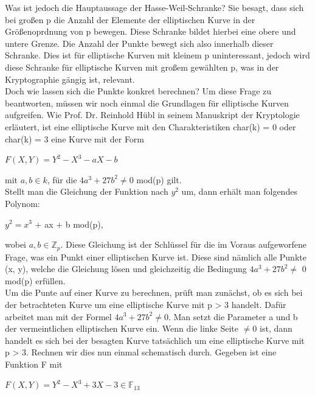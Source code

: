 Was ist jedoch die Hauptaussage der Hasse-Weil-Schranke? Sie besagt, dass sich bei großen p die Anzahl der Elemente der elliptischen Kurve in der Größenoprdnung von p bewegen. Diese Schranke bildet hierbei eine obere und untere Grenze. Die Anzahl der Punkte bewegt sich also innerhalb dieser Schranke. Dies ist für elliptische Kurven mit kleinem p uninteressant, jedoch wird diese Schranke für elliptische Kurven mit großem gewählten p, was in der Kryptographie gängig ist, relevant.\\


Doch wie lassen sich die Punkte konkret berechnen? Um diese Frage zu beantworten, müssen wir noch einmal die Grundlagen für elliptische Kurven aufgreifen. Wie Prof. Dr. Reinhold Hübl in seinem Manuskript der Kryptologie \cite[vgl.][S. 157]{reinholdhuebl} erläutert, ist eine elliptische Kurve mit den Charakteristiken char(k) = 0 oder char(k) = 3 eine Kurve mit der Form 
\begin{center}
$F(X, Y) = Y^{2} - X^{3} - aX - b$
\end{center} 

mit $a, b \in k$, für die $4a^3 + 27b^2 \neq 0$  mod(p) gilt.\\

Stellt man die Gleichung der Funktion nach $y^{2}$ um, dann erhält man folgendes Polynom:
\begin{center}
$y^{2} =  x^{3}$ + ax + b  mod(p),
\end{center}

wobei $a, b \in \mathbb{Z}_p$. Diese Gleichung ist der Schlüssel für die im Voraus aufgeworfene Frage, was ein Punkt einer elliptischen Kurve ist. Diese sind nämlich alle Punkte (x, y), welche die Gleichung lösen und gleichzeitig die Bedingung $4a^3 + 27b^2 \neq $ 0  mod(p) erfüllen.\\

Um die Punte auf einer Kurve zu berechnen, prüft man zunächst, ob es sich bei der betrachteten Kurve um eine elliptische Kurve mit p > 3 handelt. Dafür arbeitet man mit der Formel  $4a^3 + 27b^2 \neq 0$. Man setzt die Parameter a und b der vermeintlichen elliptischen Kurve ein. Wenn die linke Seite $\neq 0$ ist, dann handelt es sich bei der besagten Kurve tatsächlich um eine elliptische Kurve mit p > 3. Rechnen wir dies nun einmal schematisch durch. Gegeben ist eine Funktion F mit
\begin{center}
$F(X, Y) = Y^{2} - X^{3} + 3X - 3 \in \mathbb{F}_{13}$
\end{center} 


